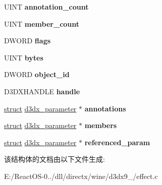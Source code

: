\begin{DoxyCompactItemize}
U\+I\+NT {\bfseries annotation\+\_\+count}
\item 
\mbox{\label{structd3dx__parameter_a4e420ba85a9e5f8d9bc47f9f7ab76b2e}} 
U\+I\+NT {\bfseries member\+\_\+count}
\item 
\mbox{\label{structd3dx__parameter_ad0adf1be6a84c9cc40e4be5967de2aed}} 
D\+W\+O\+RD {\bfseries flags}
\item 
\mbox{\label{structd3dx__parameter_a77ae87f663a93f28ed2c7ac533c50c09}} 
U\+I\+NT {\bfseries bytes}
\item 
\mbox{\label{structd3dx__parameter_af2811e1ac35e608004acabb10699b45c}} 
D\+W\+O\+RD {\bfseries object\+\_\+id}
\item 
\mbox{\label{structd3dx__parameter_ab943f34259168a6cae5a97bc8a86c523}} 
D3\+D\+X\+H\+A\+N\+D\+LE {\bfseries handle}
\item 
\mbox{\label{structd3dx__parameter_a1e540052c10d3a36d0c357ceef1010fc}} 
\hyperlink{interfacestruct}{struct} \hyperlink{structd3dx__parameter}{d3dx\+\_\+parameter} $\ast$ {\bfseries annotations}
\item 
\mbox{\label{structd3dx__parameter_a0987b1cf90475c0a3de9679a508ae65d}} 
\hyperlink{interfacestruct}{struct} \hyperlink{structd3dx__parameter}{d3dx\+\_\+parameter} $\ast$ {\bfseries members}
\item 
\mbox{\label{structd3dx__parameter_aa41e0595ade62fc2811494f3707f30f4}} 
\hyperlink{interfacestruct}{struct} \hyperlink{structd3dx__parameter}{d3dx\+\_\+parameter} $\ast$ {\bfseries referenced\+\_\+param}
\end{DoxyCompactItemize}


该结构体的文档由以下文件生成\+:\begin{DoxyCompactItemize}
\item 
E\+:/\+React\+O\+S-\/0../dll/directx/wine/d3dx9\+\_/effect.\+c\end{DoxyCompactItemize}
